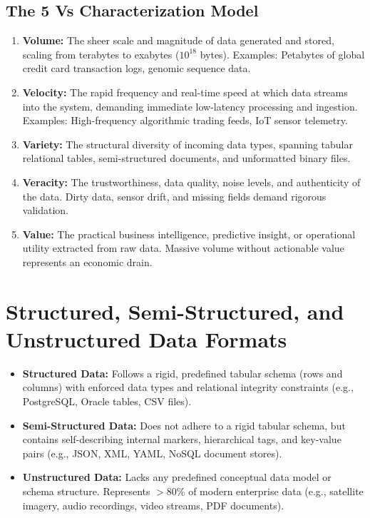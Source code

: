 \subsection{The 5 Vs Characterization Model}
\begin{enumerate}[label=\bfseries\arabic*.]
    \item \textbf{Volume:} The sheer scale and magnitude of data generated and stored, scaling from terabytes to exabytes ($10^{18}$ bytes). Examples: Petabytes of global credit card transaction logs, genomic sequence data.
    \item \textbf{Velocity:} The rapid frequency and real-time speed at which data streams into the system, demanding immediate low-latency processing and ingestion. Examples: High-frequency algorithmic trading feeds, IoT sensor telemetry.
    \item \textbf{Variety:} The structural diversity of incoming data types, spanning tabular relational tables, semi-structured documents, and unformatted binary files.
    \item \textbf{Veracity:} The trustworthiness, data quality, noise levels, and authenticity of the data. Dirty data, sensor drift, and missing fields demand rigorous validation.
    \item \textbf{Value:} The practical business intelligence, predictive insight, or operational utility extracted from raw data. Massive volume without actionable value represents an economic drain.
\end{enumerate}


\section{Structured, Semi-Structured, and Unstructured Data Formats}
\label{sec:data_formats}

\begin{itemize}
    \item \textbf{Structured Data:} Follows a rigid, predefined tabular schema (rows and columns) with enforced data types and relational integrity constraints (e.g., PostgreSQL, Oracle tables, CSV files).
    \item \textbf{Semi-Structured Data:} Does not adhere to a rigid tabular schema, but contains self-describing internal markers, hierarchical tags, and key-value pairs (e.g., JSON, XML, YAML, NoSQL document stores).
    \item \textbf{Unstructured Data:} Lacks any predefined conceptual data model or schema structure. Represents $>80\%$ of modern enterprise data (e.g., satellite imagery, audio recordings, video streams, PDF documents).
\end{itemize}


